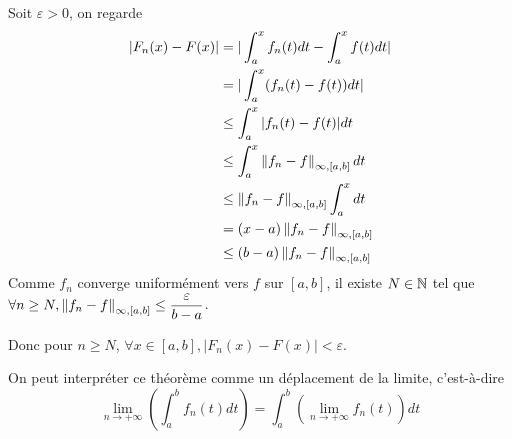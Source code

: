 \documentclass[a4paper, 12pt]{article}
\begin{document}
\begin{demonstration}
    Soit $\varepsilon > 0$, on regarde
    \begin{align*}
        |F_n(x) - F(x)| &= |\int_a^x f_n(t) dt - \int_a^x f(t) dt| \\
        &= |\int_a^x (f_n(t) - f(t)) dt| \\
        &\leq \int_a^x |f_n(t) - f(t)| dt \\
        &\leq \int_a^x \left\lVert f_n - f\right\rVert_{\infty, [a, b]} dt \\
        &\leq \left\lVert f_n - f\right\rVert_{\infty, [a, b]} \int_a^x dt \\
        &= (x - a) \left\lVert f_n - f\right\rVert_{\infty, [a, b]} \\
        &\leq (b - a) \left\lVert f_n - f\right\rVert_{\infty, [a, b]}
    \end{align*}
    Comme $f_n$ converge uniformément vers $f$ sur $[a, b]$, il existe $N \in \mathbb{N}$ tel que $\forall n \geq N, \left\lVert f_n - f\right\rVert_{\infty, [a, b]} \leq \dfrac{\varepsilon}{b - a}$.

    Donc pour $n \geq N$, $\forall x \in [a, b], |F_n(x) - F(x)| < \varepsilon$.
\end{demonstration}

\begin{remarque}
    On peut interpréter ce théorème comme un déplacement de la limite, c'est-à-dire
    $$
    \lim\limits_{n \to +\infty} \left( \int_a^b f_n(t) dt \right) = \int_a^b \left( \lim\limits_{n \to +\infty} f_n(t) \right) dt
    $$
\end{remarque}
\end{document}
